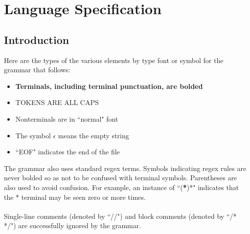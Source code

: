 \documentclass{scrartcl}
\begin{document}
\section{Language Specification}
\subsection{Introduction}
Here are the types of the various elements by type font or symbol for the grammar that follows:
\begin{itemize}
    \item \textbf{Terminals, including terminal punctuation, are bolded}
    \item TOKENS ARE ALL CAPS
    \item Nonterminals are in ``normal" font
    \item The symbol $\epsilon$ means the empty string
    \item ``EOF" indicates the end of the file
\end{itemize}
The grammar also uses standard regex terms. Symbols indicating regex rules are never bolded so as not to be confused with terminal symbols. Parentheses are also used to avoid confusion. For example, an instance of ``(\textbf{*})*" indicates that the * terminal may be seen zero or more times.\\
\\
Single-line comments (denoted by ``//") and block comments (denoted by ``/* */") are successfully ignored by the grammar.
\end{document}
